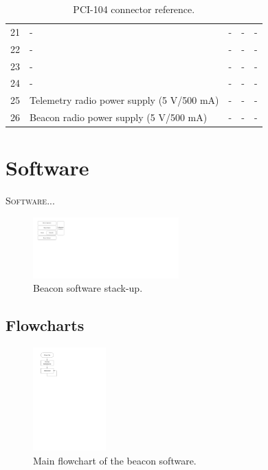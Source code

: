 \documentclass[12pt]{book}
\begin{document}
\begin{table}[!h]
\begin{center}
\begin{tabular}{L{1cm} C{3cm} C{3cm} C{3cm} C{3cm}}
			21 & - & - & - & - \\
			22 & - & - & - & - \\
			23 & - & - & - & - \\
			24 & - & - & - & - \\
			25 & Telemetry radio power supply (5 V/500 mA) & - & - & - \\
			26 & Beacon radio power supply (5 V/500 mA) & - & - & - \\
			\bottomrule[1.5pt]
		\end{tabular}
		\caption{PCI-104 connector reference.}
		\label{tab:pci104-ref}
	\end{center}
\end{table}


\chapter{Software}

\lettrine{S}{oftware}...


\begin{figure}[!h]
	\begin{center}
		\includegraphics[width=0.5\textwidth]{figures/beacon_software_layers.pdf}
		\caption{Beacon software stack-up.}
		\label{fig:beacon-software-layers}
	\end{center}
\end{figure}

\section{Flowcharts}

\begin{figure}[!h]
	\begin{center}
		\includegraphics[width=0.25\textwidth]{figures/beacon_main_flowchart.pdf}
		\caption{Main flowchart of the beacon software.}
		\label{fig:beacon-main-flowchart}
	\end{center}
\end{figure}
\end{document}
